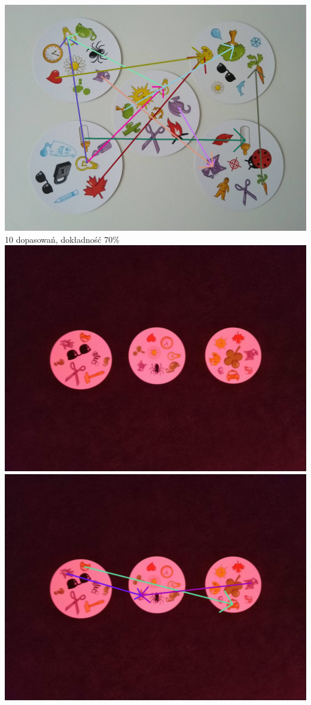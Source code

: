 \documentclass[10pt,a4paper]{article}
\begin{document}
\begin{center}
\includegraphics[scale=0.28]{hard/img_arrows14.jpg}\\
10 dopasowań, dokładność 70\%
\includegraphics[scale=0.28]{hard/dobble16.jpg}
\includegraphics[scale=0.28]{hard/img_arrows16.jpg}\\

\end{center}
\end{document}
